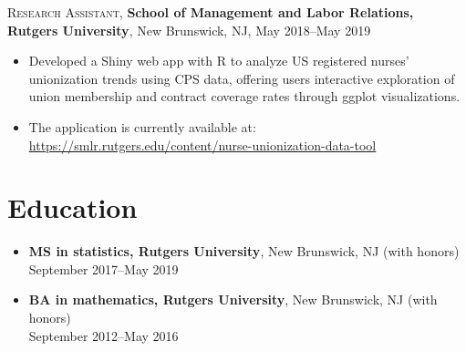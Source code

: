 \documentclass[letterpaper,10pt]{article}
\begin{document}
\textsc{Research Assistant}, \textbf{School of Management and Labor Relations, Rutgers University}, New Brunswick, NJ, May 2018--May 2019
\begin{itemize}
  \item Developed a Shiny web app with R to analyze US registered nurses' unionization trends using CPS data, offering
        users interactive exploration of union membership and contract coverage rates through ggplot visualizations.
  \item The application is currently available at: \url{https://smlr.rutgers.edu/content/nurse-unionization-data-tool}
\end{itemize}

\section*{Education}

\begin{itemize}
  \item \textbf{MS in statistics, Rutgers University}, New Brunswick, NJ (with honors) \\
        September 2017--May 2019
  \item \textbf{BA in mathematics, Rutgers University}, New Brunswick, NJ (with honors) \\
        September 2012--May 2016
\end{itemize}


\scalebox{0.1}{\color{white}{}}

\scalebox{0.1}{\color{white}{}}
\end{document}

